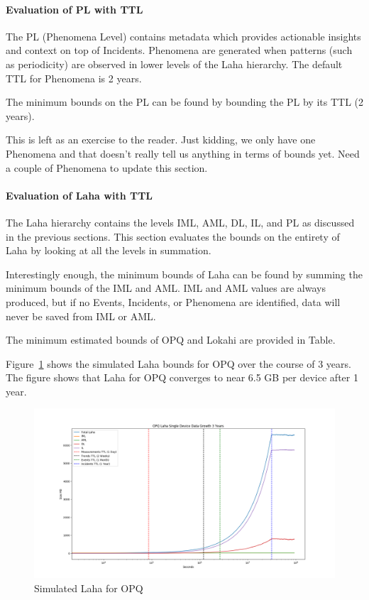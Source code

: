 \paragraph{Evaluation of PL with TTL}

The PL (Phenomena Level) contains metadata which provides actionable insights and context on top of Incidents. Phenomena are generated when patterns (such as periodicity) are observed in lower levels of the Laha hierarchy. The default TTL for Phenomena is 2 years.

The minimum bounds on the PL can be found by bounding the PL by its TTL (2 years).

This is left as an exercise to the reader. Just kidding, we only have one Phenomena and that doesn't really tell us anything in terms of bounds yet. Need a couple of Phenomena to update this section.

\paragraph{Evaluation of Laha with TTL}

The Laha hierarchy contains the levels IML, AML, DL, IL, and PL as discussed in the previous sections. This section evaluates the bounds on the entirety of Laha by looking at all the levels in summation.

Interestingly enough, the minimum bounds of Laha can be found by summing the minimum bounds of the IML and AML. IML and AML values are always produced, but if no Events, Incidents, or Phenomena are identified, data will never be saved from IML or AML.

The minimum estimated bounds of OPQ and Lokahi are provided in Table.


Figure~\ref{fig:sim_laha_opq} shows the simulated Laha bounds for OPQ over the course of 3 years. The figure shows that Laha for OPQ converges to near 6.5 GB per device after 1 year.

\begin{figure}[H]
	\centering
	\includegraphics[width=\linewidth]{figures/sim_laha_opq.png}
	\caption{Simulated Laha for OPQ}
	\label{fig:sim_laha_opq}
\end{figure}

